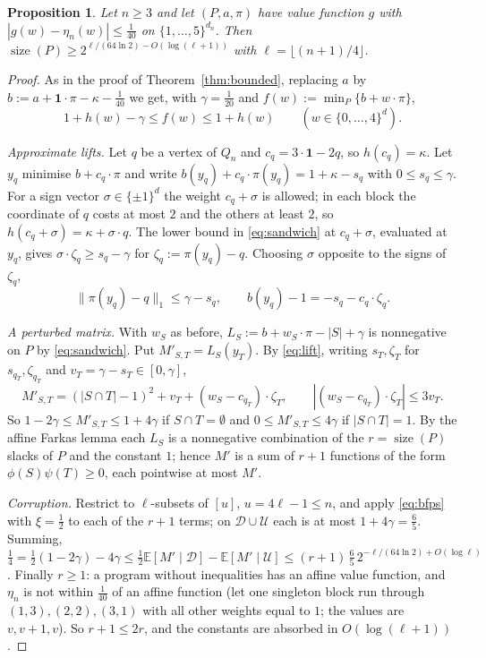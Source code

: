 \documentclass[11pt]{amsart}
\theoremstyle{plain}
\newtheorem{proposition}[theorem]{Proposition}
\theoremstyle{definition}
\theoremstyle{remark}
\newcommand{\E}{\mathbb{E}}
\newcommand{\one}{\mathbf{1}}
\newcommand{\size}{\operatorname{size}}
\begin{document}
\begin{proposition}\label{prop:small}
Let $n\ge3$ and let $(P,a,\pi)$ have value function $g$ with $|g(w)-\eta_n(w)|\le\frac1{40}$ on
$\{1,\dots,5\}^{d_n}$. Then $\size(P)\ge
2^{\ell/(64\ln2)-O(\log(\ell+1))}$ with $\ell=\lfloor(n+1)/4\rfloor$.
\end{proposition}
\begin{proof}
As in the proof of Theorem~\ref{thm:bounded}, replacing $a$ by $b:=a+\one\cdot\pi-\kappa-\frac1{40}$ we get, with
$\gamma=\frac1{20}$ and $f(w):=\min_P\{b+w\cdot\pi\}$,
\begin{equation}\label{eq:sandwich}
 1+h(w)-\gamma\le f(w)\le1+h(w)\qquad(w\in\{0,\dots,4\}^d).
\end{equation}

\emph{Approximate lifts.} Let $q$ be a vertex of $Q_n$ and $c_q=3\cdot\one-2q$, so $h(c_q)=\kappa$. Let $y_q$ minimise
$b+c_q\cdot\pi$ and write $b(y_q)+c_q\cdot\pi(y_q)=1+\kappa-s_q$ with $0\le s_q\le\gamma$. For a sign vector
$\sigma\in\{\pm1\}^d$ the weight $c_q+\sigma$ is allowed; in each block the coordinate of $q$ costs at most $2$ and
the others at least $2$, so $h(c_q+\sigma)=\kappa+\sigma\cdot q$. The lower bound in \eqref{eq:sandwich} at
$c_q+\sigma$, evaluated at $y_q$, gives $\sigma\cdot\zeta_q\ge s_q-\gamma$ for $\zeta_q:=\pi(y_q)-q$. Choosing
$\sigma$ opposite to the signs of $\zeta_q$,
\begin{equation}\label{eq:lift}
 \|\pi(y_q)-q\|_1\le\gamma-s_q,\qquad b(y_q)-1=-s_q-c_q\cdot\zeta_q .
\end{equation}

\emph{A perturbed matrix.} With $w_S$ as before, $L_S:=b+w_S\cdot\pi-|S|+\gamma$ is nonnegative on $P$ by
\eqref{eq:sandwich}. Put $M'_{S,T}=L_S(y_T)$. By \eqref{eq:lift}, writing
$s_T,\zeta_T$ for $s_{q_T},\zeta_{q_T}$ and $v_T=\gamma-s_T\in[0,\gamma]$,
\[
 M'_{S,T}=(|S\cap T|-1)^2+v_T+(w_S-c_{q_T})\cdot\zeta_T,\qquad |(w_S-c_{q_T})\cdot\zeta_T|\le3v_T .
\]
So $1-2\gamma\le M'_{S,T}\le1+4\gamma$ if $S\cap T=\emptyset$ and $0\le M'_{S,T}\le4\gamma$ if $|S\cap T|=1$. By the
affine Farkas lemma each $L_S$ is a nonnegative combination of the $r=\size(P)$ slacks of $P$ and the constant $1$;
hence $M'$ is a sum of $r+1$ functions of the form $\phi(S)\psi(T)\ge0$, each pointwise at most $M'$.

\emph{Corruption.} Restrict to $\ell$-subsets of $[u]$, $u=4\ell-1\le n$, and apply \eqref{eq:bfps} with
$\xi=\frac12$ to each of the $r+1$ terms; on $\mathcal D\cup\mathcal U$ each is at most $1+4\gamma=\frac65$. Summing,
$\frac14=\frac12(1-2\gamma)-4\gamma\le\frac12\E[M'\mid\mathcal D]-\E[M'\mid\mathcal U]\le(r+1)\,\frac65\,2^{-\ell/(64\ln2)+O(\log\ell)}$.
Finally $r\ge1$: a program without inequalities has an affine value function, and $\eta_n$ is not within
$\frac1{40}$ of an affine function (let one singleton block run through $(1,3),(2,2),(3,1)$ with all other weights
equal to $1$; the values are $v,v+1,v$). So $r+1\le2r$, and the constants are absorbed in $O(\log(\ell+1))$.
\end{proof}
\end{document}
